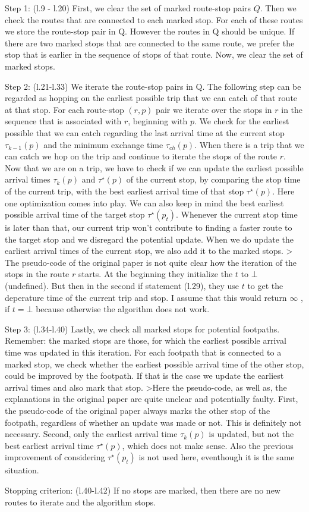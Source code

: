Step 1: (l.9 - l.20)
First, we clear the set of marked route-stop pairs $Q$. Then we check the routes that are connected to each marked stop. For each of these routes we store the route-stop pair in Q. However the routes in Q should be unique. If there are two marked stops that are connected to the same route, we prefer the stop that is earlier in the sequence of stops of that route. Now, we clear the set of marked stops.

Step  2: (l.21-l.33)
We iterate the route-stop pairs in Q. The following step can be regarded as hopping on the earliest possible trip that we can catch of that route at that stop. For each route-stop $(r,p)$ pair we iterate over the stops in $r$ in the sequence that is associated with $r$, beginning with $p$. We check for the earliest possible that we can catch regarding the last arrival time at the current stop $\tau_{k-1}(p)$ and the minimum exchange time $\tau_{ch}(p)$. When there is a trip that we can catch we hop on the trip and continue to iterate the stops of the route $r$. Now that we are on a trip, we have to check if we can update the earliest possible arrival times $\tau_k(p)$ and $\tau^\star(p)$ of the current stop, by comparing the stop time of the current trip, with the best earliest arrival time of that stop $\tau^\star(p)$. Here one optimization comes into play. We can also keep in mind the best earliest possible arrival time of the target stop $\tau^\star(p_t)$. Whenever the current stop time is later than that, our current trip won't contribute to finding a faster route to the target stop and we disregard the potential update. When we do update the earliest arrival times of the current stop, we also add it to the marked stops.
> The pseudo-code of the original paper is not quite clear how the iteration of the stops in the route $r$ starts. At the beginning they initialize the $t$ to $\bot$ (undefined). But then in the second if statement (l.29), they use $t$ to get the deperature time of the current trip and stop. I assume that this would return $\infty$ , if $t=\bot$ because otherwise the algorithm does not work.

Step 3: (l.34-l.40)
Lastly, we check all marked stops for potential footpaths. Remember: the marked stops are those, for which the earliest possible arrival time was updated in this iteration. For each footpath that is connected to a marked stop, we check whether the earliest possible arrival time of the other stop, could be improved by the footpath. If that is the case we update the earliest arrival times and also mark that stop.
>Here the pseudo-code, as well as, the explanations in the original paper are quite unclear and potentially faulty. First, the pseudo-code of the original paper always marks the other stop of the footpath, regardless of whether an update was made or not. This is definitely not necessary. Second, only the earliest arrival time $\tau_k(p)$  is updated, but not the best earliest arrival time $\tau^\star(p)$, which does not make sense. Also the previous improvement of considering $\tau^\star(p_t)$ is not used here, eventhough it is the same situation.

Stopping criterion: (l.40-l.42)
If no stops are marked, then there are no new routes to iterate and the algorithm stops.

